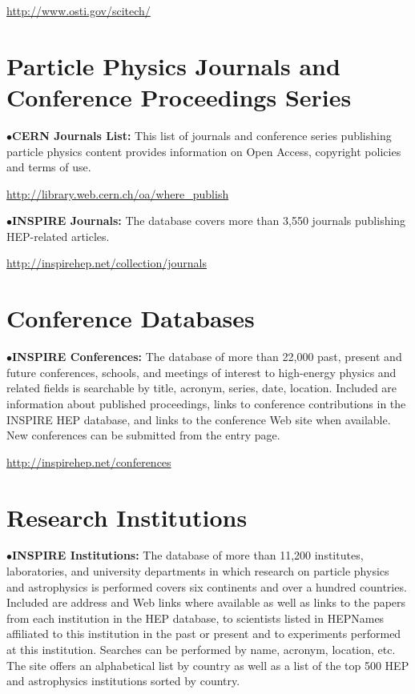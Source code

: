    \item{}\qquad\url{http://www.osti.gov/scitech/}
\medskip

\vglue -0.1in
\section{Particle Physics Journals and Conference Proceedings Series}%

\item{$\bullet$}{\bf CERN Journals List:}
This list of journals and conference series publishing particle physics content provides information on Open Access, copyright policies and terms of use.

   \item{}\qquad\url{http://library.web.cern.ch/oa/where_publish}
\medskip

\item{$\bullet$}{\bf INSPIRE Journals:}
The database covers more than 3,550 journals publishing HEP-related articles.

   \item{}\qquad\url{http://inspirehep.net/collection/journals}
\medskip


\section{Conference Databases}%

\item{$\bullet$}{\bf INSPIRE Conferences:}
The database of more than 22,000 past, present and future conferences, schools, and meetings of interest to high-energy physics and related fields is searchable by title, acronym, series, date, location. Included are information about published proceedings, links to conference contributions in the INSPIRE HEP database, and links to the conference Web site when available. New conferences can be submitted from the entry page.
	\item{}\qquad\url{http://inspirehep.net/conferences}


\section{Research Institutions}%

\item{$\bullet$}{\bf INSPIRE Institutions:}
The database of more than 11,200 institutes, laboratories, and university departments in which research on particle physics and astrophysics is performed covers six continents and over a hundred countries. Included are address and Web links where available as well as links to the papers from each institution in the HEP database, to scientists listed in HEPNames affiliated to this institution in the past or present and to experiments performed at this institution. Searches can be performed by name, acronym, location, etc. The site offers an alphabetical list by country as well as a list of the top 500 HEP and astrophysics institutions sorted by country.

